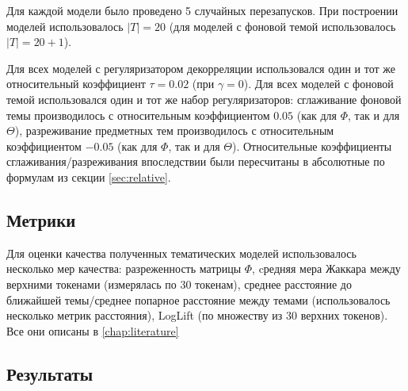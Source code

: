 Для каждой модели было проведено 5 случайных перезапусков. При построении моделей использовалось $|T|= 20$ (для моделей с фоновой темой использовалось $|T|= 20+1$).

Для всех моделей с регуляризатором декорреляции использовался один и тот же относительный коэффициент $\tau = 0.02$ (при $\gamma=0$). Для всех моделей с фоновой темой использовался один и тот же набор регуляризаторов: сглаживание фоновой темы производилось с относительным коэффициентом $0.05$ (как для $\Phi$, так и для $\Theta$), разреживание предметных тем производилось  с относительным коэффициентом $-0.05$ (как для $\Phi$, так и для $\Theta$). Относительные коэффициенты сглаживания/разреживания впоследствии были пересчитаны в абсолютные по формулам из секции \ref{sec:relative}.

\subsection{Метрики}

Для оценки качества полученных тематических моделей использовалось несколько мер качества: разреженность матрицы $\Phi$, cредняя мера Жаккара между верхними токенами (измерялась по 30 токенам), среднее расстояние до ближайшей темы/среднее попарное расстояние между темами (использовалось несколько метрик расстояния), LogLift (по множеству из 30 верхних токенов). Все они описаны в \ref{chap:literature}

\subsection{Результаты}



